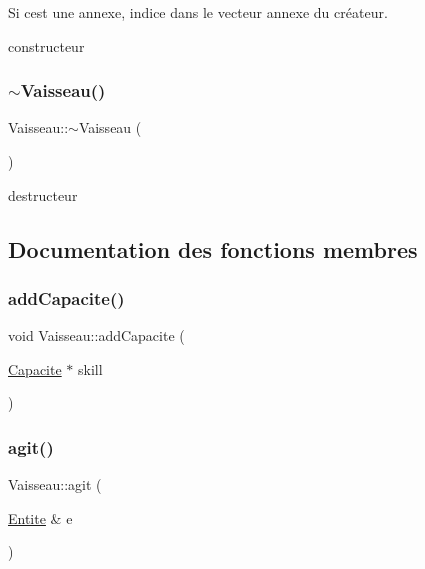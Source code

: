 Si c\textquotesingle{}est une annexe, indice dans le vecteur annexe du créateur. 

constructeur \mbox{\label{class_vaisseau_a3360bd62af7a7aaf5732b86d639a0674}} 
\subsubsection{\texorpdfstring{$\sim$\+Vaisseau()}{~Vaisseau()}}
{\footnotesize\ttfamily Vaisseau\+::$\sim$\+Vaisseau (\begin{DoxyParamCaption}{ }\end{DoxyParamCaption})\hspace{0.3cm}{\ttfamily [override]}}



destructeur 



\subsection{Documentation des fonctions membres}
\mbox{\label{class_vaisseau_a04d7069231187e7dba26a06a0aaf2508}} 
\subsubsection{\texorpdfstring{add\+Capacite()}{addCapacite()}}
{\footnotesize\ttfamily void Vaisseau\+::add\+Capacite (\begin{DoxyParamCaption}\item[{\hyperlink{class_capacite}{Capacite} $\ast$}]{skill }\end{DoxyParamCaption})\hspace{0.3cm}{\ttfamily [inline]}}

\mbox{\label{class_vaisseau_a0cd6733845f221c2a5a9d7ccd7f43137}} 
\subsubsection{\texorpdfstring{agit()}{agit()}}
{\footnotesize\ttfamily Vaisseau\+::agit (\begin{DoxyParamCaption}\item[{\hyperlink{class_entite}{Entite} \&}]{e }\end{DoxyParamCaption})\hspace{0.3cm}{\ttfamily [virtual]}}



